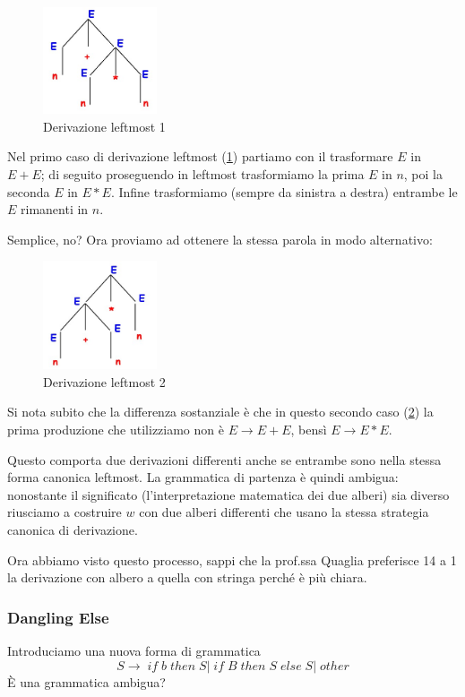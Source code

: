 \documentclass[class=book, crop=false, oneside, 12pt]{standalone}
\begin{document}
\begin{figure}[H]
	\centering
	\includegraphics[width=0.3\textwidth,keepaspectratio]{leftmost_1.jpg}
    \caption{Derivazione leftmost 1}
    \label{leftmost_1}
\end{figure}
Nel primo caso di derivazione leftmost (\ref{leftmost_1}) partiamo con il trasformare $E$ in $E+E$; di seguito proseguendo in leftmost trasformiamo la prima $E$ in $n$, poi la seconda $E$ in $E*E$.
Infine trasformiamo (sempre da sinistra a destra) entrambe le $E$ rimanenti in $n$.

Semplice, no? Ora proviamo ad ottenere la stessa parola in modo alternativo:
\begin{figure}[H]
	\centering
	\includegraphics[width=0.3\textwidth,keepaspectratio]{leftmost_2.jpg}
    \caption{Derivazione leftmost 2}
    \label{leftmost_2}
\end{figure}
Si nota subito che la differenza sostanziale è che in questo secondo caso (\ref{leftmost_2}) la prima produzione che utilizziamo non è $E \to E+E$, bensì $E \to E*E$.

Questo comporta due derivazioni differenti anche se entrambe sono nella stessa forma canonica leftmost.
La grammatica di partenza è quindi ambigua: nonostante il significato (l'interpretazione matematica dei due alberi) sia diverso riusciamo a costruire $w$ con due alberi differenti che usano la stessa strategia canonica di derivazione.

Ora abbiamo visto questo processo, sappi che la prof.ssa Quaglia preferisce 14 a 1 la derivazione con albero a quella con stringa perché è più chiara.

\subsubsection*{Dangling Else}
Introduciamo una nuova forma di grammatica
\begin{equation}
    S \to \; if \; b \; then \; S |\; if\; B\; then\; S\; else\; S |\; other    
\end{equation}
È una grammatica ambigua?
\end{document}

